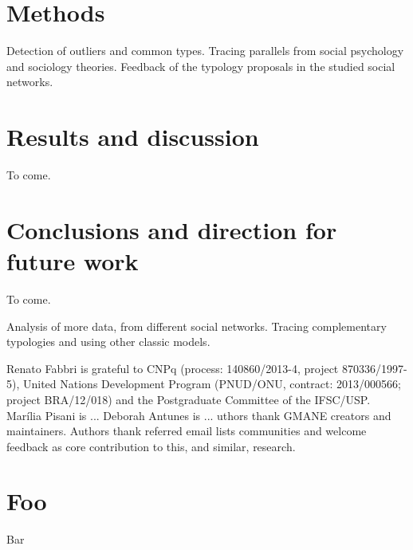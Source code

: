 \documentclass[%
 aip,
 jmp,%
 amsmath,amssymb,
 reprint,%
]{revtex4-1}
\begin{document}
\section{Methods}
Detection of outliers and common types. Tracing parallels from social psychology and sociology theories.
Feedback of the typology proposals in the studied social networks.

\section{Results and discussion}
To come.

\section{Conclusions and direction for future work}
To come.

Analysis of more data, from different social networks. Tracing complementary typologies and using other classic models.
\begin{acknowledgments}
Renato Fabbri is grateful to CNPq (process: 140860/2013-4,
project 870336/1997-5), United Nations Development Program (PNUD/ONU, contract: 2013/000566; project BRA/12/018)  and 
the Postgraduate Committee of the IFSC/USP. Marília Pisani is ... Deborah Antunes is ...
uthors thank GMANE creators and maintainers. Authors thank referred email lists communities and welcome feedback as core contribution to this, and similar, research.
\end{acknowledgments}


\appendix
\section{Foo}
Bar

\nocite{*}
\end{document}
